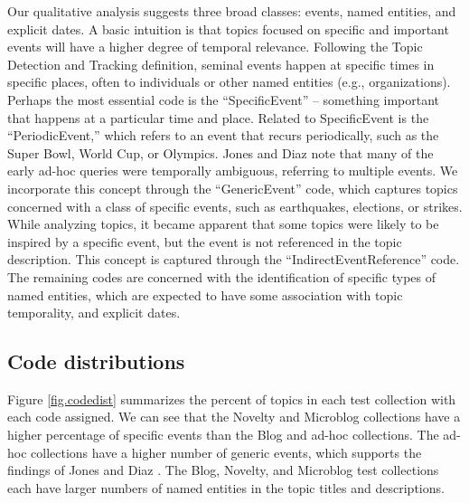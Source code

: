 \documentclass[runningheads,a4paper]{llncs}
\begin{document}
Our qualitative analysis suggests three broad classes: events, named entities, and explicit dates. A basic intuition is that topics focused on specific and important events will have a higher degree of temporal relevance. Following the Topic Detection and Tracking definition, seminal events happen at specific times in specific places, often to individuals or other named entities (e.g., organizations). Perhaps the most essential code is the ``SpecificEvent'' -- something important that happens at a particular time and place. Related to SpecificEvent is the ``PeriodicEvent,'' which refers to an event that recurs periodically, such as the Super Bowl, World Cup, or Olympics. Jones and Diaz \cite{Jones2007} note that many of the early ad-hoc queries were temporally ambiguous, referring to multiple events. We incorporate this concept through the ``GenericEvent'' code, which captures topics concerned with a class of specific events, such as earthquakes, elections, or strikes. While analyzing topics, it became apparent that some topics were likely to be inspired by a specific event, but the event is not referenced in the topic description. This concept is captured through the ``IndirectEventReference'' code. The remaining codes are concerned with the identification of specific types of named entities, which are expected to have some  association with topic temporality, and explicit dates.


\subsection{Code distributions}

Figure \ref{fig.codedist} summarizes the percent of topics in each test collection with each code assigned. We can see that the Novelty and Microblog  collections have a higher percentage of specific events than the Blog and ad-hoc collections. The ad-hoc collections have a higher number of generic events, which supports the findings of Jones and Diaz \cite{Jones2007}. The Blog, Novelty, and Microblog test collections each have larger numbers of named entities in the topic titles and descriptions.
\end{document}
